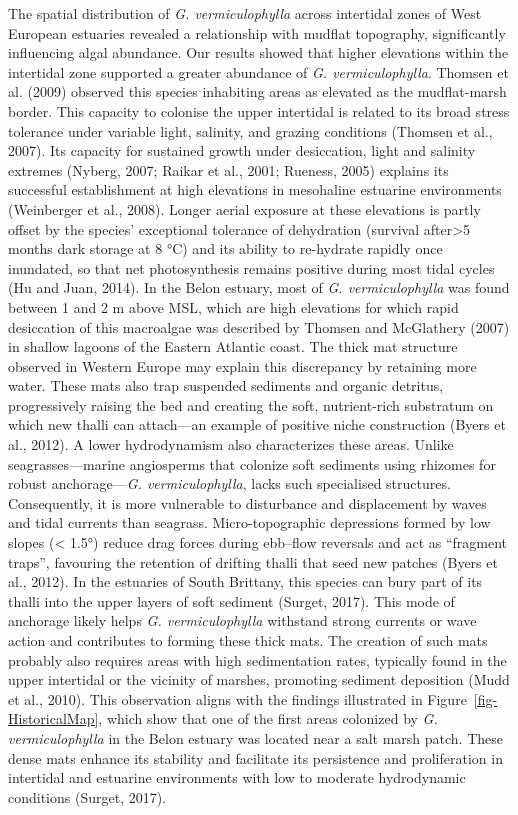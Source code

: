 \documentclass[
  letterpaper,
  DIV=11,
  numbers=noendperiod]{scrartcl}
\begin{document}
The spatial distribution of \emph{G. vermiculophylla} across intertidal
zones of West European estuaries revealed a relationship with mudflat
topography, significantly influencing algal abundance. Our results
showed that higher elevations within the intertidal zone supported a
greater abundance of \emph{G. vermiculophylla}. Thomsen et al. (2009)
observed this species inhabiting areas as elevated as the mudflat-marsh
border. This capacity to colonise the upper intertidal is related to its
broad stress tolerance under variable light, salinity, and grazing
conditions (Thomsen et al., 2007). Its capacity for sustained growth
under desiccation, light and salinity extremes (Nyberg, 2007; Raikar et
al., 2001; Rueness, 2005) explains its successful establishment at high
elevations in mesohaline estuarine environments (Weinberger et al.,
2008). Longer aerial exposure at these elevations is partly offset by
the species' exceptional tolerance of dehydration (survival
after\textgreater5 months dark storage at 8 °C) and its ability to
re-hydrate rapidly once inundated, so that net photosynthesis remains
positive during most tidal cycles (Hu and Juan, 2014). In the Belon
estuary, most of \emph{G. vermiculophylla} was found between 1 and 2 m
above MSL, which are high elevations for which rapid desiccation of this
macroalgae was described by Thomsen and McGlathery (2007) in shallow
lagoons of the Eastern Atlantic coast. The thick mat structure observed
in Western Europe may explain this discrepancy by retaining more water.
These mats also trap suspended sediments and organic detritus,
progressively raising the bed and creating the soft, nutrient-rich
substratum on which new thalli can attach---an example of positive niche
construction (Byers et al., 2012). A lower hydrodynamism also
characterizes these areas. Unlike seagrasses---marine angiosperms that
colonize soft sediments using rhizomes for robust anchorage---\emph{G.
vermiculophylla}, lacks such specialised structures. Consequently, it is
more vulnerable to disturbance and displacement by waves and tidal
currents than seagrass. Micro-topographic depressions formed by low
slopes (\textless{} 1.5°) reduce drag forces during ebb--flow reversals
and act as ``fragment traps'', favouring the retention of drifting
thalli that seed new patches (Byers et al., 2012). In the estuaries of
South Brittany, this species can bury part of its thalli into the upper
layers of soft sediment (Surget, 2017). This mode of anchorage likely
helps \emph{G. vermiculophylla} withstand strong currents or wave action
and contributes to forming these thick mats. The creation of such mats
probably also requires areas with high sedimentation rates, typically
found in the upper intertidal or the vicinity of marshes, promoting
sediment deposition (Mudd et al., 2010). This observation aligns with
the findings illustrated in Figure~\ref{fig-HistoricalMap}, which show
that one of the first areas colonized by \emph{G. vermiculophylla} in
the Belon estuary was located near a salt marsh patch. These dense mats
enhance its stability and facilitate its persistence and proliferation
in intertidal and estuarine environments with low to moderate
hydrodynamic conditions (Surget, 2017).
\end{document}
